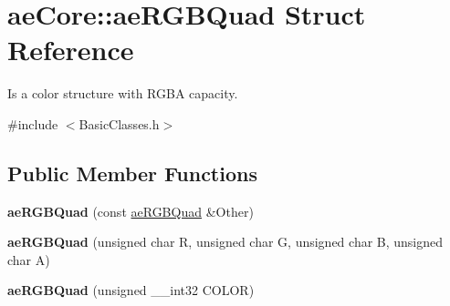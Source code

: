 \hypertarget{structae_core_1_1ae_r_g_b_quad}{}\section{ae\+Core\+:\+:ae\+R\+G\+B\+Quad Struct Reference}
\label{structae_core_1_1ae_r_g_b_quad}


Is a color structure with R\+G\+BA capacity.  




{\ttfamily \#include $<$Basic\+Classes.\+h$>$}

\subsection*{Public Member Functions}
\begin{DoxyCompactItemize}
\item 
{\bfseries ae\+R\+G\+B\+Quad} (const \hyperlink{structae_core_1_1ae_r_g_b_quad}{ae\+R\+G\+B\+Quad} \&Other)\hypertarget{structae_core_1_1ae_r_g_b_quad_a35ee8c4e94a64f2ff611ab9cd4e099ee}{}\label{structae_core_1_1ae_r_g_b_quad_a35ee8c4e94a64f2ff611ab9cd4e099ee}

\item 
{\bfseries ae\+R\+G\+B\+Quad} (unsigned char R, unsigned char G, unsigned char B, unsigned char A)\hypertarget{structae_core_1_1ae_r_g_b_quad_a439c01503811646a2d0f5a2d543cf21b}{}\label{structae_core_1_1ae_r_g_b_quad_a439c01503811646a2d0f5a2d543cf21b}

\item 
{\bfseries ae\+R\+G\+B\+Quad} (unsigned \+\_\+\+\_\+int32 C\+O\+L\+OR)\hypertarget{structae_core_1_1ae_r_g_b_quad_af2a4bdd8be5268f72e93d742202136ca}{}\label{structae_core_1_1ae_r_g_b_quad_af2a4bdd8be5268f72e93d742202136ca}

\end{DoxyCompactItemize}
